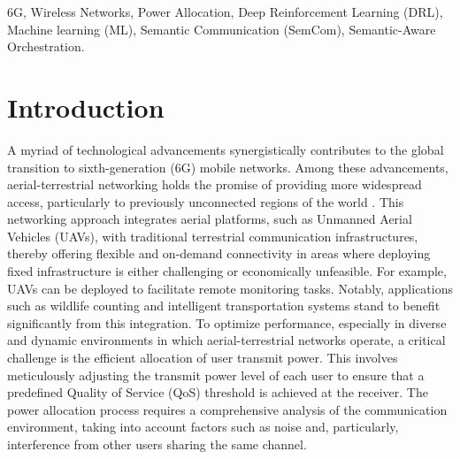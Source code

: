 \documentclass[conference]{IEEEtran}
\begin{document}
\begin{IEEEkeywords}
6G, Wireless Networks, Power Allocation, Deep Reinforcement Learning (DRL), Machine learning (ML), Semantic Communication (SemCom), Semantic-Aware Orchestration.
\end{IEEEkeywords}

\section{Introduction}
A myriad of technological advancements synergistically contributes to the global transition to sixth-generation (6G) mobile networks. Among these advancements, aerial-terrestrial networking holds the promise of providing more widespread access, particularly to previously unconnected regions of the world \cite{drones6060147, gao2024space}. This networking approach integrates aerial platforms, such as Unmanned Aerial Vehicles (UAVs), with traditional terrestrial communication infrastructures, thereby offering flexible and on-demand connectivity in areas where deploying fixed infrastructure is either challenging or economically unfeasible. For example, UAVs can be deployed to facilitate remote monitoring tasks. Notably, applications such as wildlife counting \cite{attard2024review} and intelligent transportation systems \cite{afrin2024advancements} stand to benefit significantly from this integration. To optimize performance, especially in diverse and dynamic environments in which aerial-terrestrial networks operate, a critical challenge is the efficient allocation of user transmit power. This involves meticulously adjusting the transmit power level of each user to ensure that a predefined Quality of Service (QoS) threshold is achieved at the receiver. The power allocation process requires a comprehensive analysis of the communication environment, taking into account factors such as noise and, particularly, interference from other users sharing the same channel.
\end{document}
